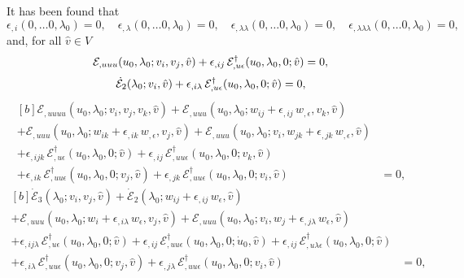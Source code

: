 \documentclass[12pt, final]{scrartcl}
\theoremstyle{definition}
\newcommand{\E}{\mathcal E}
\newcommand{\EE}{\mathcal E ^ \dagger}
\begin{document}
It has been found that
\begin{equation}
  \epsilon_{,i}(0, \ldots 0, \lambda_0) = 0, \quad  \epsilon_{,\lambda}(0, \ldots 0, \lambda_0) = 0, \quad \epsilon_{,\lambda\lambda}(0, \ldots 0, \lambda_0) = 0, \quad \epsilon_{,\lambda\lambda\lambda}(0, \ldots 0, \lambda_0) = 0,
\end{equation}
and, for all \(\hat{v} \in V\)
\begin{equation}
  \label{eq:20221116151527}
  \E_{,uuu}(u_0, \lambda_0; v_i, v_j, \hat{v}) + \epsilon_{,ij} \, \EE_{,u\epsilon}(u_0, \lambda_0, 0; \hat{v}) = 0,\\
\end{equation}
\begin{equation}
  \label{eq:20221116151638}
  \dot{\E}_2(\lambda_0; v_i, \hat{v}) + \epsilon_{,i\lambda} \, \EE_{,u\epsilon}(u_0, \lambda_0, 0; \hat{v}) = 0,\\
\end{equation}
\begin{equation}
  \label{eq:20221116152151}
  \begin{aligned}[b]
    \E_{,uuuu}(u_0, \lambda_0; v_i, v_j, v_k, \hat{v}) + \E_{,uuu}(u_0, \lambda_0; w_{ij} + \epsilon_{,ij} \, w_{,\epsilon},  v_k, \hat{v})&\\
    + \E_{,uuu}(u_0, \lambda_0; w_{ik} + \epsilon_{,ik} \,  w_{,\epsilon}, v_j, \hat{v}) + \E_{,uuu}(u_0, \lambda_0; v_i, w_{jk} + \epsilon_{,jk} \,  w_{,\epsilon}, \hat{v})&\\
    + \epsilon_{,ijk} \, \EE_{,u\epsilon}(u_0, \lambda_0, 0; \hat{v}) + \epsilon_{,ij} \, \EE_{,uu\epsilon}(u_0, \lambda_0, 0; v_k, \hat{v}) &\\
    + \epsilon_{,ik} \, \EE_{,uu\epsilon}(u_0, \lambda_0, 0; v_j, \hat{v}) + \epsilon_{,jk} \, \EE_{,uu\epsilon}(u_0, \lambda_0, 0; v_i, \hat{v}) &= 0,
  \end{aligned}
\end{equation}
\begin{equation}
  \label{eq:20221116152457}
  \begin{aligned}[b]
    \dot{\E}_3(\lambda_0; v_i, v_j, \hat{v}) + \dot{\E}_2(\lambda_0; w_{ij} + \epsilon_{,ij} \, w_\epsilon, \hat{v}) &\\
    + \E_{,uuu}(u_0, \lambda_0; w_i + \epsilon_{,i\lambda} \,  w_\epsilon, v_j, \hat{v}) + \E_{,uuu}(u_0, \lambda_0; v_i, w_j + \epsilon_{,j\lambda} \,  w_\epsilon, \hat{v}) &\\
    + \epsilon_{,ij\lambda} \, \EE_{,u\epsilon}(u_0, \lambda_0, 0; \hat{v}) + \epsilon_{,ij} \, \EE_{,uu\epsilon}(u_0, \lambda_0, 0; \dot{u}_0, \hat{v}) + \epsilon_{,ij} \, \EE_{,u\lambda\epsilon}(u_0, \lambda_0, 0; \hat{v}) &\\
    + \epsilon_{,i\lambda} \, \EE_{,uu\epsilon}(u_0, \lambda_0, 0; v_j, \hat{v}) + \epsilon_{,j\lambda} \, \EE_{,uu\epsilon}(u_0, \lambda_0, 0; v_i, \hat{v}) &= 0,
  \end{aligned}
\end{equation}
\end{document}
